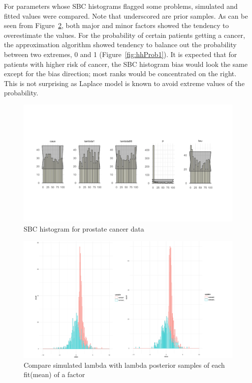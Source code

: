 \documentclass{article}
\begin{document}
  For parameters whose SBC histograms flagged some problems, simulated and fitted values were compared. Note that underscored are prior samples. As can be seen from Figure~\ref{fig:hhLambda}, both major and minor factors showed the tendency to overestimate the values. For the probability of certain patients getting a cancer, the approximation algorithm showed tendency to balance out the probability between two extremes, 0 and 1 (Figure~\ref{fig:hhProb1}). It is expected that for patients with higher risk of cancer, the SBC histogram bias would look the same except for the bias direction; most ranks would be concentrated on the right. This is not surprising as Laplace model is known to avoid extreme values of the probability.
  
    \begin{figure}[!htb]
  \centering
    \includegraphics[width=\textwidth]{writeup/figures/horseshoe_sbc.pdf}
    \caption{SBC histogram for prostate cancer data}
    \label{fig:hhSBC}
  \end{figure}
  
  \begin{figure}[!htb]
  \centering
    \includegraphics[width=\textwidth]{writeup/figures/horseshoe_lambda1_86.pdf}
    \caption{Compare simulated lambda with lambda posterior samples of each fit(mean) of a factor}
    \label{fig:hhLambda}
  \end{figure}
  
\end{document}
